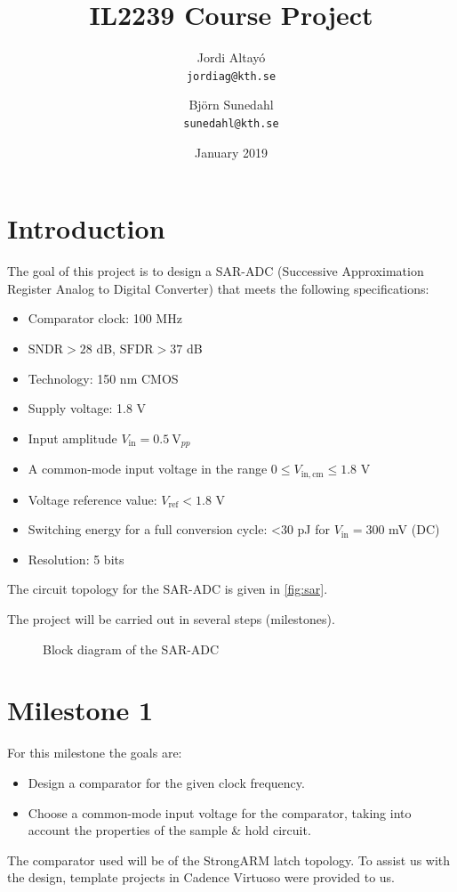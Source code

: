 \documentclass{article}
\title{IL2239 Course Project}
\author{Jordi Altayó \\\texttt{jordiag@kth.se}\and Björn Sunedahl\\\texttt{sunedahl@kth.se}}
\date{January 2019}
\newcommand*{\subb}[1]{\ensuremath{_{\mathrm{#1}}}}
\begin{document}
 \maketitle
 \section*{Introduction}
 The goal of this project is to design a SAR-ADC (Successive Approximation Register Analog to Digital Converter) that meets the following specifications:
 \begin{itemize}
  \item Comparator clock: 100 MHz
  \item $\mathrm{SNDR} > 28$ dB, $\mathrm{SFDR} > 37$ dB
  \item Technology: 150 nm CMOS
  \item Supply voltage: 1.8 V
  \item Input amplitude $V\subb{in}=\SI{0.5}{\volt_{pp}}$
  \item A common-mode input voltage in the range $0 \le V\subb{in,cm} \le 1.8$ V
  \item Voltage reference value: $V\subb{ref}<1.8$ V
  \item Switching energy for a full conversion cycle: \textless 30 pJ for $V\subb{in}=300$ mV (DC)
  \item Resolution: 5 bits
 \end{itemize}
 The circuit topology for the SAR-ADC is given in \autoref{fig:sar}.\bigskip

 \noindent The project will be carried out in several steps (milestones).

 \begin{figure}[!h]
  \centering
  
  \caption{Block diagram of the SAR-ADC}
  \label{fig:sar}
 \end{figure}

 \section*{Milestone 1}
 \setcounter{section}{1}
 For this milestone the goals are:
 \begin{itemize}
  \item Design a comparator for the given clock frequency.
  \item Choose a common-mode input voltage for the comparator, taking into account the properties of the sample \& hold circuit.
 \end{itemize}
 The comparator used will be of the StrongARM latch topology. To assist us with the design, template projects in Cadence Virtuoso were provided to us.\bigskip
\end{document}
